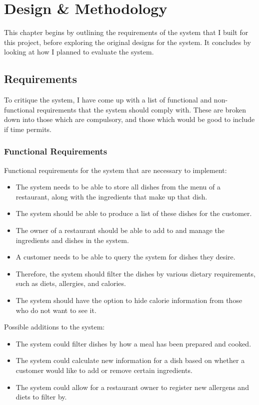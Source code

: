 \chapter{Design \& Methodology}

This chapter begins by outlining the requirements of the system that I built for this project, before exploring the original designs for the system. It concludes by looking at how I planned to evaluate the system.

\section{Requirements}
\label{section:SystemRequirements}

To critique the system, I have come up with a list of functional and non-functional requirements that the system should comply with. These are broken down into those which are compulsory, and those which would be good to include if time permits.

\subsection{Functional Requirements}
\label{section:FunctionalRequirements}

Functional requirements for the system that are necessary to implement:

\begin{itemize}
\item The system needs to be able to store all dishes from the menu of a restaurant, along with the ingredients that make up that dish.
\item The system should be able to produce a list of these dishes for the customer.
\item The owner of a restaurant should be able to add to and manage the ingredients and dishes in the system.
\item A customer needs to be able to query the system for dishes they desire.
\item Therefore, the system should filter the dishes by various dietary requirements, such as diets, allergies, and calories.
\item The system should have the option to hide calorie information from those who do not want to see it.
\end{itemize}

Possible additions to the system:

\begin{itemize}
\item The system could filter dishes by how a meal has been prepared and cooked.
\item The system could calculate new information for a dish based on whether a customer would like to add or remove certain ingredients.
\item The system could allow for a restaurant owner to register new allergens and diets to filter by.
\end{itemize}

